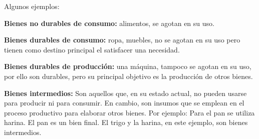 Algunos ejemplos:

\textbf{Bienes no durables de consumo:}
alimentos, se agotan en su uso.

\textbf{Bienes durables de consumo:}
ropa, muebles, no se agotan en su uso pero tienen como destino principal el 
satisfacer una necesidad.

\textbf{Bienes durables de producción:} 
una máquina,
tampoco se agotan en su uso,
por ello son durables,
pero su principal objetivo es la producción de otros bienes.

\textbf{Bienes intermedios:}
Son aquellos que,
en su estado actual,
no pueden usarse para producir ni para consumir.
En cambio,
son insumos que se emplean en el proceso productivo para elaborar otros bienes.
Por ejemplo:
Para el pan se utiliza harina.
El pan es un bien final.
El trigo y la harina,
en este ejemplo,
son bienes intermedios.
